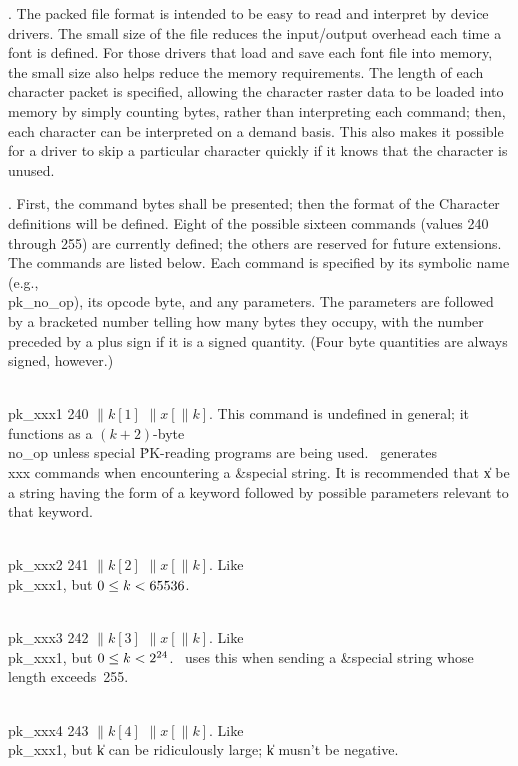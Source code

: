 \fi

. The packed file format is intended to be easy to read and interpret by
device drivers.  The small size of the file reduces the input/output overhead
each time a font is defined.  For those drivers that load and save each font
file into memory, the small size also helps reduce the memory requirements.
The length of each character packet is specified, allowing the character raster
data to be loaded into memory by simply counting bytes, rather than
interpreting each command; then, each character can be interpreted on a demand
basis.  This also makes it possible for a driver to skip a particular
character quickly if it knows that the character is unused.

\fi

. First, the command bytes shall be presented; then the format of the
Character definitions will be defined.  Eight of the possible sixteen
commands (values 240 through 255) are currently defined; the others are
reserved for future extensions.  The commands are listed below.  Each command
is specified by its symbolic name (e.g., \\{pk\_no\_op}), its opcode byte,
and any parameters.  The parameters are followed by a bracketed number
telling how many bytes they occupy, with the number preceded by a plus sign if
it is a signed quantity.  (Four byte quantities are always signed, however.)

\yskip\hang\\{pk\_xxx1} 240 $\|k[1]$ $\|x[\|k]$.  This command is undefined in
general;
it functions as a $(k+2)$-byte \\{no\_op} unless special \.{PK}-reading
programs are being used.  \MF\ generates \\{xxx} commands when encountering
a \&{special} string.  It is recommended that \|x be a string having the form
of a keyword followed by possible parameters relevant to that keyword.

\yskip\hang\\{pk\_xxx2} 241 $\|k[2]$ $\|x[\|k]$.  Like \\{pk\_xxx1}, but $0\L%
\|k<65536$.

\yskip\hang\\{pk\_xxx3} 242 $\|k[3]$ $\|x[\|k]$.  Like \\{pk\_xxx1}, but
$0\le\hbox{$k$}<\hbox{$2^{24}$}$.  \MF\ uses this when sending a \&{special} string
whose
length exceeds~255.

\yskip\hang\\{pk\_xxx4} 243 $\|k[4]$ $\|x[\|k]$.  Like \\{pk\_xxx1}, but \|k
can be
ridiculously large; \|k musn't be negative.

